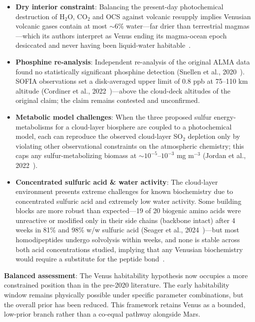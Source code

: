 \documentclass[aps,prd,twocolumn,superscriptaddress,nofootinbib]{revtex4-2}
\begin{document}
\begin{itemize}
  \item \textbf{Dry interior constraint}: Balancing the present-day photochemical destruction of H$_{2}$O, CO$_{2}$ and OCS against volcanic resupply implies Venusian volcanic gases contain at most ${\sim}$6\% water---far drier than terrestrial magmas---which its authors interpret as Venus ending its magma-ocean epoch desiccated and never having been liquid-water habitable~\cite{Constantinou2024}.
  \item \textbf{Phosphine re-analysis}: Independent re-analysis of the original ALMA data found no statistically significant phosphine detection (Snellen et al., 2020~\cite{Snellen2020}). SOFIA observations set a disk-averaged upper limit of 0.8 ppb at 75--110 km altitude (Cordiner et al., 2022~\cite{Cordiner2022})---above the cloud-deck altitudes of the original claim; the claim remains contested and unconfirmed.
  \item \textbf{Metabolic model challenges}: When the three proposed sulfur energy-metabolisms for a cloud-layer biosphere are coupled to a photochemical model, each can reproduce the observed cloud-layer SO$_{2}$ depletion only by violating other observational constraints on the atmospheric chemistry; this caps any sulfur-metabolizing biomass at ${\sim}10^{-5}$--$10^{-3}$ mg m$^{-3}$ (Jordan et al., 2022~\cite{Jordan2022}).
  \item \textbf{Concentrated sulfuric acid \& water activity}: The cloud-layer environment presents extreme challenges for known biochemistry due to concentrated sulfuric acid and extremely low water activity. Some building blocks are more robust than expected---19 of 20 biogenic amino acids were unreactive or modified only in their side chains (backbone intact) after 4 weeks in 81\% and 98\% w/w sulfuric acid (Seager et al., 2024~\cite{Seager2024amino})---but most homodipeptides undergo solvolysis within weeks, and none is stable across both acid concentrations studied, implying that any Venusian biochemistry would require a substitute for the peptide bond~\cite{Petkowski2024dipeptide}.
\end{itemize}

\textbf{Balanced assessment}: The Venus habitability hypothesis now occupies a more constrained position than in the pre-2020 literature. The early habitability window remains physically possible under specific parameter combinations, but the overall prior has been reduced. This framework retains Venus as a bounded, low-prior branch rather than a co-equal pathway alongside Mars.
\end{document}
